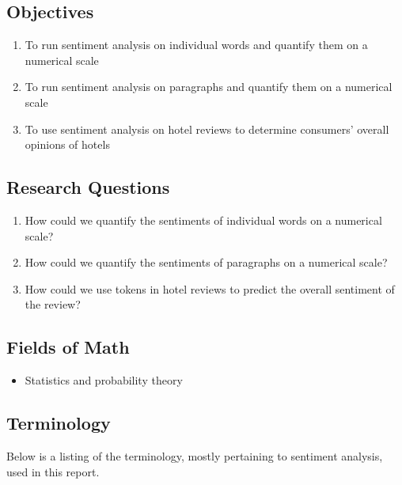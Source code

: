 \documentclass[12pt,bibliography=totocnumbered]{scrartcl}
\begin{document}
\subsection{Objectives}
\begin{enumerate}
	\item To run sentiment analysis on individual words and quantify them on a numerical scale
	\item To run sentiment analysis on paragraphs and quantify them on a numerical scale
	\item To use sentiment analysis on hotel reviews to determine consumers' overall opinions of hotels
\end{enumerate}

\subsection{Research Questions}
\begin{enumerate}
	\item How could we quantify the sentiments of individual words on a numerical scale?
	\item How could we quantify the sentiments of paragraphs on a numerical scale?
	\item How could we use tokens in hotel reviews to predict the overall sentiment of the review?
\end{enumerate}

\subsection{Fields of Math}
\begin{itemize}
	\item Statistics and probability theory
\end{itemize}

\subsection{Terminology}
Below is a listing of the terminology, mostly pertaining to sentiment
analysis, used in this report.
\end{document}
